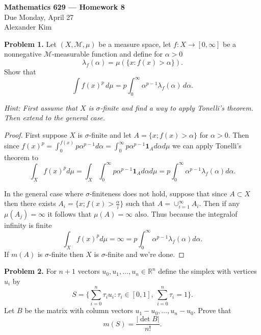 \documentclass[11pt]{article}
\newcommand{\R}{\mathbb{R}}
\begin{document}
\begin{center}
    {\Large\bfseries Mathematics 629 --- Homework 8} \\[6pt]
    {\large Due Monday, April 27} \\[6pt]
    Alexander Kim
\end{center}

\bigskip

\noindent\textbf{Problem 1.}
Let $(X, \mathcal{M}, \mu)$ be a measure space, let $f : X \to [0, \infty]$ be a nonnegative $\mathcal{M}$-measurable function and define for $\alpha > 0$
\[
    \lambda_f(\alpha) = \mu(\{x : f(x) > \alpha\}).
\]
Show that
\[
    \int f(x)^p\,d\mu = p \int_0^\infty \alpha^{p-1} \lambda_f(\alpha)\,d\alpha.
\]

\medskip
\noindent\textit{Hint: First assume that $X$ is $\sigma$-finite and find a way to apply Tonelli's theorem. Then extend to the general case.}

\bigskip
\begin{proof}
	First suppose $X$ is $\sigma$-finite and let $A = \{x; f(x) > \alpha\}$ for $\alpha >0$. Then since $f(x)^p = \int_0^{f(x)}p\alpha^{p-1} d\alpha = \int_0^\infty p\alpha^{p-1}\mathbf{1}_A d\alpha d\mu$ we can apply Tonelli's theorem to 
	$$\int_X f(x)^p d\mu = \int_X \int_0^\infty p\alpha^{p-1}\mathbf{1}_A d\alpha d\mu = p \int_0^\infty \alpha^{p-1} \lambda_f(\alpha) d\alpha.$$

	In the general case where $\sigma$-finiteness does not hold, suppose that since $A \subset X$ then there exists $A_i = \{x; f(x) > \frac{\alpha}{i}\}$ such that $A = \cup_{i=1}^\infty A_i$. 
	Then if any $\mu(A_j) = \infty$ it follows that $\mu(A) = \infty$ also. Thus because the integralof infinity is finite
	$$\int_X f(x)^p d\mu = \infty = p\int_0^\infty \alpha^{p-1}\lambda_f(\alpha)d\alpha.$$
	If $m(A)$ is $\sigma$-finite then $X$ is $\sigma$-finite and we're done.  
\end{proof}


\noindent\textbf{Problem 2.}
For $n+1$ vectors $u_0, u_1, \ldots, u_n \in \R^n$ define the simplex with vertices $u_i$ by
\[
    S = \Big\{ \sum_{i=0}^n \tau_i u_i : \tau_i \in [0,1],\ \sum_{i=0}^n \tau_i = 1 \Big\}.
\]
Let $B$ be the matrix with column vectors $u_1 - u_0, \ldots, u_n - u_0$. Prove that
\[
    m(S) = \frac{|\det B|}{n!}.
\]
\end{document}
